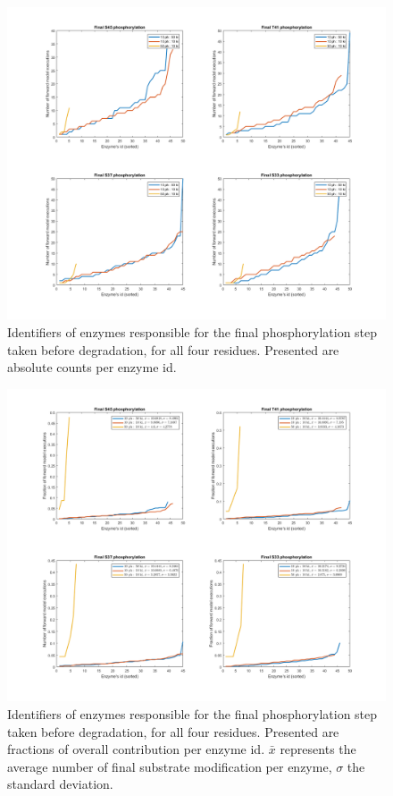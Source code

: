 \begin{figure}[p]
  \centering
  \includegraphics[scale=0.35]{wnt/F4_final_phosphorylation_enzyme_id_absolute}
  \caption{Identifiers of enzymes responsible for the final
    phosphorylation step taken before degradation, for all four
    residues. Presented are absolute counts per enzyme id.}
  \label{F4}
\end{figure}


\begin{figure}[p]
  \centering
  \includegraphics[scale=0.35]{wnt/F5_final_phosphorylation_enzyme_id_fraction}
  \caption{Identifiers of enzymes responsible for the final
    phosphorylation step taken before degradation, for all four
    residues. Presented are fractions of overall contribution per
    enzyme id. $\bar{x}$ represents the average number of final
    substrate modification per enzyme, $\sigma$ the standard
    deviation.}
  \label{F5}
\end{figure}


